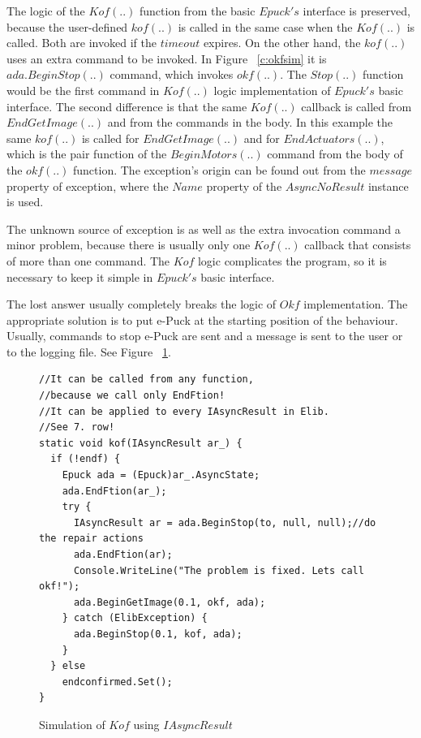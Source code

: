   The logic of the $Kof(..)$ function from the basic $Epuck's$ interface is preserved, because the user-defined
  $kof(..)$ is called in the same case when the $Kof(..)$ is called. Both are invoked if the $timeout$ expires.
  On the other hand, the $kof(..)$ uses an extra command to be invoked. In Figure ~\ref{c:okfsim} it
  is $ada.BeginStop(..)$ command, which invokes $okf(..)$. The $Stop(..)$ function would be the first command
  in $Kof(..)$ logic implementation of $Epuck's$ basic interface.
  The second difference is that the same $Kof(..)$ callback is called from $EndGetImage(..)$ and from the
  commands in the body. In this example the same $kof(..)$ is called for $EndGetImage(..)$ and 
  for $EndActuators(..)$, which is the pair function of the $BeginMotors(..)$ 
  command from the body of the $okf(..)$ function.
  The exception's origin can be found out from the $message$ property of exception, 
  where the $Name$ property of the $AsyncNoResult$ instance is used.

  The unknown source of exception is as well as the extra invocation command a minor problem, because
  there is usually only one $Kof(..)$ callback that consists of more than one command. 
  The $Kof$ logic complicates the program, so it is necessary to keep it simple in $Epuck's$ basic interface.

  The lost answer usually completely breaks the logic of $Okf$ implementation.
  The appropriate solution is to put e-Puck
  at the starting position of the behaviour. Usually, commands to stop e-Puck are sent 
  and a message is sent to the user or to the logging file.
  See Figure ~\ref{iasynckof}.

\begin{figure}[!hbp]
\begin{lstlisting}
//It can be called from any function,
//because we call only EndFtion!
//It can be applied to every IAsyncResult in Elib.
//See 7. row!
static void kof(IAsyncResult ar_) {
  if (!endf) {
    Epuck ada = (Epuck)ar_.AsyncState;
    ada.EndFtion(ar_);
    try {
      IAsyncResult ar = ada.BeginStop(to, null, null);//do the repair actions
      ada.EndFtion(ar);
      Console.WriteLine("The problem is fixed. Lets call okf!");
      ada.BeginGetImage(0.1, okf, ada);
    } catch (ElibException) {
      ada.BeginStop(0.1, kof, ada);
    }
  } else
    endconfirmed.Set();
}
\end{lstlisting}
\caption{Simulation of $Kof$ using $IAsyncResult$}
\label{iasynckof}
\end{figure}

